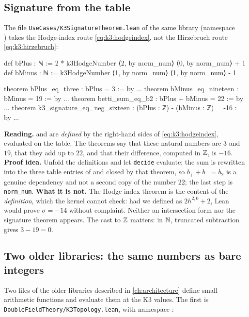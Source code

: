 \subsection{Signature from the table}

The file \texttt{UseCases/K3SignatureTheorem.lean} of the same library (namespace\\
) takes the Hodge-index route
\eqref{eq:k3:hodgeindex}, not the Hirzebruch route \eqref{eq:k3:hirzebruch}:

\begin{leancode}
def bPlus : ℕ := 2 * k3HodgeNumber ⟨2, by norm_num⟩ ⟨0, by norm_num⟩ + 1
def bMinus : ℕ := k3HodgeNumber ⟨1, by norm_num⟩ ⟨1, by norm_num⟩ - 1

theorem bPlus_eq_three : bPlus = 3 := by ...
theorem bMinus_eq_nineteen : bMinus = 19 := by ...
theorem betti_sum_eq_b2 : bPlus + bMinus = 22 := by ...
theorem k3_signature_eq_neg_sixteen :
    (bPlus : ℤ) - (bMinus : ℤ) = -16 := by ...
\end{leancode}

\begin{leanbox}[In Lean: $2\cdot1+1=3$, $20-1=19$, $3-19=-16$]
\textbf{Reading.}  and  are \emph{defined} by the right-hand sides of
\eqref{eq:k3:hodgeindex}, evaluated on the table. The theorems say that these natural numbers are
$3$ and $19$, that they add up to $22$, and that their difference, computed in $\mathbb{Z}$, is $-16$.
\textbf{Proof idea.} Unfold the definitions and let \texttt{decide} evaluate; the sum is
rewritten into the three table entries of  and closed by that theorem, so
$b_++b_-=b_2$ is a genuine dependency and not a second copy of the number $22$; the last step
is \texttt{norm\_num}. \textbf{What it is not.} The Hodge index theorem is the content of the
\emph{definition}, which the kernel cannot check: had we defined  as $2h^{2,0}+2$, Lean
would prove $\sigma=-14$ without complaint. Neither an intersection form nor the signature
theorem appears. The cast to $\mathbb{Z}$ matters: in $\mathbb{N}$, truncated subtraction gives $3-19=0$.
\end{leanbox}

\subsection{Two older libraries: the same numbers as bare integers}

Two files of the older libraries described in \cref{ch:architecture} define small arithmetic
functions and evaluate them at the K3 values. The first is
\texttt{DoubleFieldTheory/K3Topology.lean}, with namespace :

